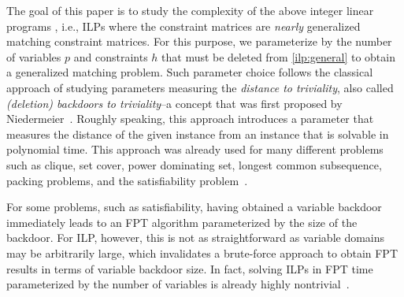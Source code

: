 \documentclass[a4paper,UKenglish,cleveref,thm-restate]{lipics-v2021}
\begin{document}
The goal of this paper is to study the complexity of the above integer linear programs , i.e., ILPs where the constraint matrices are \emph{nearly} generalized matching constraint matrices. For this purpose, we parameterize by the number of variables $p$ and constraints $h$ that must be deleted from \cref{ilp:general} to obtain a generalized matching problem. Such parameter choice follows the classical approach of studying parameters measuring the \emph{distance to triviality}, also called \emph{(deletion) backdoors to triviality}--a concept that was first proposed by Niedermeier~\cite{DBLP:books/ox/Niedermeier06}. Roughly speaking, this approach introduces a parameter that measures the distance of the given instance from an instance that is solvable in polynomial time. This approach was already used for many different problems such as clique, set cover, power dominating set, longest common subsequence, packing problems, and the satisfiability problem~\cite{DBLP:books/ox/Niedermeier06,DBLP:conf/mfcs/BannachBMMLRS20,DBLP:journals/jacm/GoemansR20,DBLP:conf/birthday/GaspersS12}. 

For some problems, such as satisfiability, having obtained a variable backdoor immediately leads to an FPT algorithm parameterized by the size of the backdoor. For ILP, however, this is not as straightforward as variable domains may be arbitrarily large, which invalidates a brute-force approach to obtain FPT results in terms of variable backdoor size. In fact, solving ILPs in FPT time parameterized by the number of variables is already highly nontrivial~\cite{DBLP:journals/mor/Lenstra83,DBLP:conf/focs/ReisR23}.
\end{document}
